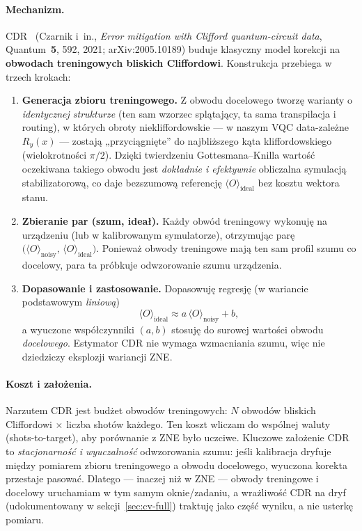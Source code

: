\documentclass[11pt,a4paper]{article}
\begin{document}
\paragraph{Mechanizm.} CDR~\cite{czarnik2021} (Czarnik i~in., \emph{Error mitigation with Clifford
quantum-circuit data}, Quantum~\textbf{5}, 592, 2021; arXiv:2005.10189) buduje klasyczny model korekcji na
\textbf{obwodach treningowych bliskich Cliffordowi}. Konstrukcja przebiega w trzech krokach:
\begin{enumerate}
\item \textbf{Generacja zbioru treningowego.} Z obwodu docelowego tworzę warianty o
      \emph{identycznej strukturze} (ten sam wzorzec splątający, ta sama transpilacja i routing),
      w których obroty niekliffordowskie --- w naszym VQC data-zależne $R_y(x)$ --- zostają
      „przyciągnięte'' do najbliższego kąta kliffordowskiego (wielokrotności $\pi/2$). Dzięki
      twierdzeniu Gottesmana--Knilla wartość oczekiwana takiego obwodu jest \emph{dokładnie i
      efektywnie} obliczalna symulacją stabilizatorową, co daje bezszumową referencję
      $\langle O\rangle_{\text{ideal}}$ bez kosztu wektora stanu.
\item \textbf{Zbieranie par (szum, ideał).} Każdy obwód treningowy wykonuję na urządzeniu (lub w
      kalibrowanym symulatorze), otrzymując parę
      $\bigl(\langle O\rangle_{\text{noisy}},\,\langle O\rangle_{\text{ideal}}\bigr)$. Ponieważ
      obwody treningowe mają ten sam profil szumu co docelowy, para ta próbkuje odwzorowanie
      szumu urządzenia.
\item \textbf{Dopasowanie i zastosowanie.} Dopasowuję regresję (w wariancie podstawowym
      \emph{liniową})
      \begin{equation}
      \langle O\rangle_{\text{ideal}} \approx a\,\langle O\rangle_{\text{noisy}} + b,
      \end{equation}
      a wyuczone współczynniki $(a,b)$ stosuję do surowej wartości obwodu \emph{docelowego}. Estymator
      CDR nie wymaga wzmacniania szumu, więc nie dziedziczy eksplozji wariancji ZNE.
\end{enumerate}

\paragraph{Koszt i założenia.} Narzutem CDR jest budżet obwodów treningowych: $N$ obwodów bliskich
Cliffordowi ${\times}$ liczba shotów każdego. Ten koszt wliczam do wspólnej waluty
(shots-to-target), aby porównanie z ZNE było uczciwe. Kluczowe założenie CDR to
\emph{stacjonarność i wyuczalność} odwzorowania szumu: jeśli kalibracja dryfuje między pomiarem
zbioru treningowego a obwodu docelowego, wyuczona korekta przestaje pasować. Dlatego --- inaczej
niż w ZNE --- obwody treningowe i docelowy uruchamiam w tym samym oknie/zadaniu, a wrażliwość CDR na
dryf (udokumentowany w sekcji~\ref{sec:cv-full}) traktuję jako część wyniku, a nie usterkę
pomiaru.
\end{document}
